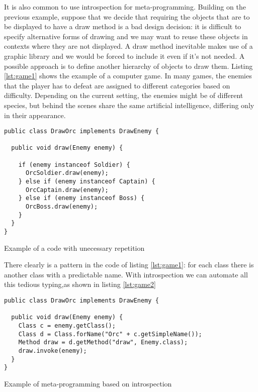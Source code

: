 It is also common to use introspection for meta-programming. Building on the previous example, suppose that we decide that
requiring the objects that are to be displayed to have a draw method is a bad design decision: it is difficult to specify
alternative forms of drawing and we may want to reuse these objects in contexts where they are not displayed. A draw method
inevitable makes use of a graphic library and we would be forced to include it even if it's not needed. A possible
approach is to define another hierarchy of objects to draw them. Listing \ref{lst:game1} shows the example of a computer game.
In many games, the enemies that the player has to defeat are assigned to different categories based on difficulty. Depending
on the current setting, the enemies might be of different species, but behind the scenes share the same artificial intelligence,
differing only in their appearance.

\begin{listing}[H]
\begin{verbatim}
public class DrawOrc implements DrawEnemy {

  public void draw(Enemy enemy) {
    
    if (enemy instanceof Soldier) {
      OrcSoldier.draw(enemy);
    } else if (enemy instanceof Captain) {
      OrcCaptain.draw(enemy);
    } else if (enemy instanceof Boss) {
      OrcBoss.draw(enemy);
    }
  }
} 
\end{verbatim}
\caption{Example of a code with unecessary repetition}
\label{lst:game1}
\end{listing}

There clearly is a pattern in the code of listing \ref{lst:game1}: for each class there is another class with a predictable name. With introspection we
can automate all this tedious typing,as shown in listing \ref{lst:game2}

\begin{listing}[H]
\begin{verbatim}
public class DrawOrc implements DrawEnemy {

  public void draw(Enemy enemy) {
    Class c = enemy.getClass();    
    Class d = Class.forName("Orc" + c.getSimpleName());    
    Method draw = d.getMethod("draw", Enemy.class);
    draw.invoke(enemy);
  }
}
\end{verbatim}
\caption{Example of meta-programming based on introspection}
\label{lst:game2}
\end{listing}

